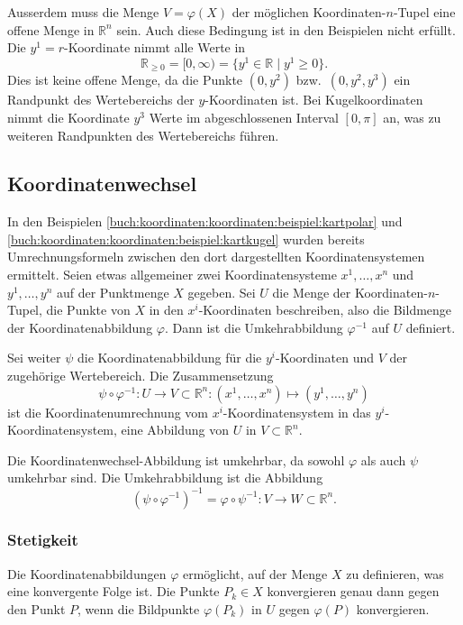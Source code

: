 Ausserdem muss die Menge $V=\varphi(X)$ der möglichen Koordinaten-$n$-Tupel
eine offene Menge in $\mathbb{R}^n$ sein.
Auch diese Bedingung ist in den Beispielen nicht erfüllt.
Die $y^1=r$-Koordinate nimmt alle Werte in
\[
\mathbb{R}_{\ge 0}
=
[0,\infty)
=
\{
y^1\in\mathbb{R}
\mid
y^1\ge 0
\}.
\]
%
Dies ist keine offene Menge, da die Punkte $(0,y^2)$ bzw.~$(0,y^2,y^3)$
ein Randpunkt des Wertebereichs der $y$-Koordinaten ist.
%
%
Bei Kugelkoordinaten nimmt die Koordinate $y^3$ Werte im
abgeschlossenen Interval $[0,\pi]$ an, was zu weiteren Randpunkten
des Wertebereichs führen.


%
%
\subsection{Koordinatenwechsel
\label{buch:koordinaten:koordinaten:subsection:koordinatenwechsel}}
In den Beispielen
\ref{buch:koordinaten:koordinaten:beispiel:kartpolar}
und
\ref{buch:koordinaten:koordinaten:beispiel:kartkugel}
wurden bereits Umrechnungsformeln zwischen den dort dargestellten
Koordinatensystemen ermittelt.
Seien etwas allgemeiner zwei Koordinatensysteme $x^1,\dots,x^n$
und $y^1,\dots,y^n$ auf der Punktmenge $X$ gegeben.
Sei $U$ die Menge der Koordinaten-$n$-Tupel, die Punkte von $X$
in den $x^i$-Koordinaten beschreiben, also die Bildmenge der
Koordinatenabbildung $\varphi$.
Dann ist die Umkehrabbildung $\varphi^{-1}$ auf $U$ definiert.

Sei weiter $\psi$ die Koordinatenabbildung für die $y^i$-Koordinaten
und $V$ der zugehörige Wertebereich.
Die Zusammensetzung
\[
\psi
\circ
\varphi^{-1}
\colon
U\to V\subset\mathbb{R}^n
:
(x^1,\dots,x^n)
\mapsto
(y^1,\dots,y^n)
\]
ist die Koordinatenumrechnung vom $x^i$-Koordinatensystem in
das $y^i$-Koordinatensystem, eine Abbildung von $U$ in $V\subset\mathbb{R}^n$.


Die Koordinatenwechsel-Abbildung ist umkehrbar, da sowohl $\varphi$
als auch $\psi$ umkehrbar sind.
Die Umkehrabbildung ist die Abbildung
\[
(\psi\circ\varphi^{-1})^{-1}
=
\varphi\circ\psi^{-1}
\colon
V\to W \subset \mathbb{R}^n.
\]

%
%
\subsubsection{Stetigkeit}
Die Koordinatenabbildungen $\varphi$ ermöglicht, auf der Menge
$X$ zu definieren, was eine konvergente Folge ist.
Die Punkte $P_k\in X$ konvergieren genau dann gegen den Punkt $P$,
wenn die Bildpunkte $\varphi(P_k)$ in $U$ gegen $\varphi(P)$
konvergieren.

